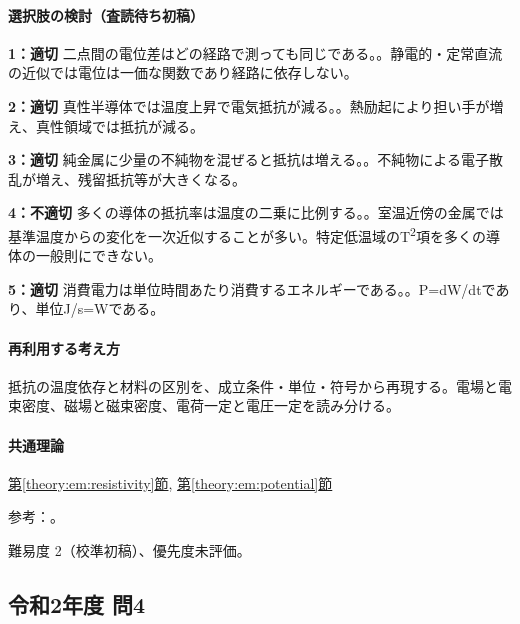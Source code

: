 \paragraph{選択肢の検討（査読待ち初稿）}\mbox{}\par

\noindent\textbf{1：適切} 二点間の電位差はどの経路で測っても同じである。。静電的・定常直流の近似では電位は一価な関数であり経路に依存しない。\par

\noindent\textbf{2：適切} 真性半導体では温度上昇で電気抵抗が減る。。熱励起により担い手が増え、真性領域では抵抗が減る。\par

\noindent\textbf{3：適切} 純金属に少量の不純物を混ぜると抵抗は増える。。不純物による電子散乱が増え、残留抵抗等が大きくなる。\par

\noindent\textbf{4：不適切} 多くの導体の抵抗率は温度の二乗に比例する。。室温近傍の金属では基準温度からの変化を一次近似することが多い。特定低温域のT\textsuperscript{2}項を多くの導体の一般則にできない。\par

\noindent\textbf{5：適切} 消費電力は単位時間あたり消費するエネルギーである。。P=\allowbreak{}dW/dtであり、単位J/s=\allowbreak{}Wである。\par

\paragraph{再利用する考え方} 抵抗の温度依存と材料の区別を、成立条件・単位・符号から再現する。電場と電束密度、磁場と磁束密度、電荷一定と電圧一定を読み分ける。

\paragraph{共通理論} \hyperref[theory:em:resistivity]{第\ref*{theory:em:resistivity}節}, \hyperref[theory:em:potential]{第\ref*{theory:em:potential}節}

\par 参考：\cite{mit_em06,mit_semiconductor}。

\par 難易度 2（校準初稿）、優先度未評価。

\subsection{令和2年度 問4}
\label{q:r02-reg-applied-04}

